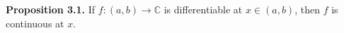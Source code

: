 \textbf{Proposition 3.1.} If $f: (a, b) \to \mathbb{C}$ is differentiable at $x \in (a, b)$, then $f$ is continuous at $x$.
